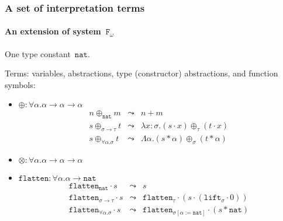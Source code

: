 \documentclass[10pt,presentation,color=names]{beamer}
\newcommand{\Fomega}{\mathtt{F}_\omega}
\newcommand{\arrtype}{\rightarrow}
\newcommand{\quant}[2]{\forall #1.#2}
\newcommand{\app}[2]{#1 \cdot #2}
\newcommand{\tapp}[2]{#1 * #2}
\newcommand{\subst}[2]{#1:=#2}
\newcommand{\abs}[2]{\lambda #1.#2}
\newcommand{\tabs}[2]{\Lambda #1.#2}
\newcommand{\arrW}{\leadsto}
\newcommand{\nat}{\mathtt{nat}}
\newcommand{\flatten}{\mathtt{flatten}}
\newcommand{\lift}{\mathtt{lift}}
\begin{document}
\begin{frame} %
  \frametitle{A set of interpretation terms}
  \framesubtitle{An extension of system~$\Fomega$}
  One type constant~$\nat$.\pause

  \medskip

  Terms: variables, abstractions, type (constructor) abstractions, and
  function symbols\pause:
  \begin{itemize}
  \item $\oplus : \forall \alpha . \alpha \arrtype \alpha \arrtype
    \alpha$\pause
    \[
    \begin{array}{rcl}
      n \oplus_{\nat} m &\arrW& n+m\\
      s \oplus_{\sigma \arrtype \tau} t &\arrW&
      \abs{x:\sigma}{(\app{s}{x}) \oplus_\tau (\app{t}{x})}\\
      s \oplus_{\quant{\alpha}{\sigma}} t &\arrW&
      \tabs{\alpha}{(\tapp{s}{\alpha}) \oplus_\sigma (\tapp{t}{\alpha})}
    \end{array}
    \]\pause
  \item $\otimes : \forall \alpha . \alpha \arrtype \alpha \arrtype
    \alpha$\pause
  \item $\flatten : \forall \alpha . \alpha \arrtype \nat$\pause
    \[
    \begin{array}{rcl}
      \app{\flatten_\nat}{s} &\arrW& s\\
      \app{\flatten_{\sigma \arrtype \tau}}{s} &\arrW& \app{\flatten_\tau}{(\app{s}{(\app{\lift_\sigma}{0})})}\\
      \app{\flatten_{\quant{\alpha}{\sigma}}}{s} &\arrW& \app{\flatten_{\sigma[\subst{\alpha}{\nat}]}}{(\tapp{s}{\nat})}
    \end{array}
    \]\pause

\end{itemize}
\end{frame}
\end{document}
